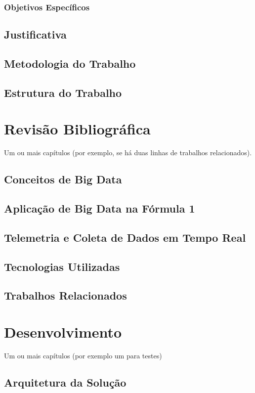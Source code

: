 \documentclass[12pt, %
openright, 
oneside, %
a4paper,    %
brazil]{facom-ufu-abntex2}
\begin{document}
\subsection{Objetivos Específicos}
\section{Justificativa}
\section{Metodologia do Trabalho}
\section{Estrutura do Trabalho}


\chapter{Revisão Bibliográfica}
Um ou mais capítulos (por exemplo, se há duas linhas de trabalhos relacionados).
\section{Conceitos de Big Data}
\section{Aplicação de Big Data na Fórmula 1}
\section{Telemetria e Coleta de Dados em Tempo Real}
\section{Tecnologias Utilizadas}
\section{Trabalhos Relacionados}


\chapter{Desenvolvimento}
Um ou mais capítulos (por exemplo um para testes)
\section{Arquitetura da Solução}
\end{document}
